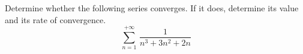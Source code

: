 Determine whether the following series converges.
If it does, determine its value and its rate of convergence.
\begin{equation*}
   \sum\limits_{n = 1}^{+\infty} {\, \frac{1}{n^3 + 3 n^2 + 2n}}
\end{equation*}
